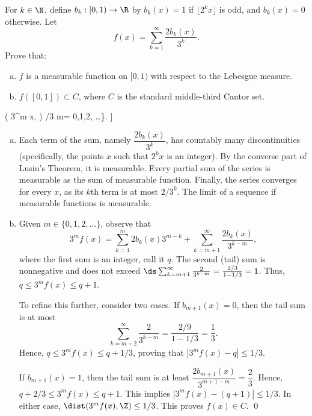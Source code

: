 \begin{hwsol}
For $k \in \N$, define $b_k: [0, 1) \to \R$ by $b_k(x)= 1$ if $\lfloor 2^k x\rfloor$ is odd, and $b_k (x)= 0$ otherwise. Let 
        \[
        f(x)= \sum_{k=1}^\infty \frac{2 b_k(x)}{3^k}.
        \]
Prove that: \hfill
        \begin{enumerate}[(a)]
        \item $f$ is a measurable function on $[0,1)$ with respect to the Lebesgue measure. 
        \item $f([0, 1]) \subset C$, where $C$ is the standard middle-third Cantor set. 
        \end{enumerate}
\noindent [Hint: You can use the following characterization of $C$, 
	\[
	C= \{ x \in [0, 1] \colon \dist( 3^m x, \Z) /3  m= 0,1,2,  \ldots \}. ]
	\]

\pf \hfill
\begin{enumerate}[(a)]
\item Each term of the sum, namely $\dfrac{2 b_k(x)}{3^k}$, has countably many discontinuities (specifically, the points $x$ such that $2^k x$ is an integer). By the converse part of Lusin's Theorem, it is measurable. Every partial sum of the series is measurable as  the sum of measurable function. Finally, the series converges for every $x$, as its $k$th term is at most $2/3^k$. The limit of a sequence if measurable functions is measurable.  

\item Given $m \in \{0,1,2, \ldots\}$, observe that 
        \[
        3^m f(x)= \sum_{k=1}^m 2 b_k(x)  3^{m-k} + \sum_{k=m+1}^\infty \frac{2 b_k(x)}{3^{k-m}},
        \]
where the first sum is an integer, call it $q$. The second (tail) sum is nonnegative and does not exceed $\ds\sum_{k=m+1}^\infty \frac{2  }{3^{k-m}}= \frac{2/3}{1-1/3}= 1$. Thus, $q \leq 3^{m}f(x) \leq q+1$. 

To refine this further, consider two cases. If $b_{m+1}(x)=0$, then the tail sum is at most 
        \[
        \sum_{k=m+2}^\infty \frac{2 }{3^{k-m}}= \frac{2/9}{1-1/3} = \frac{1}{3}.
        \]
Hence, $q \leq 3^{m}f(x) \leq q+1/3$, proving that $|3^m f(x) - q| \leq 1/3$.  

If $b_{m+1}(x)= 1$, then the tail sum is at least $\dfrac{2 b_{m+1}(x)}{3^{m+1-m}}= \dfrac{2}{3}$. Hence, $q + 2/3 \leq 3^{m}f(x) \leq q +  1$. This implies $|3^m f(x) - (q+1)|  \leq 1/3$. In either case, $\dist(3^mf(x), \Z) \leq 1/3$. This proves $f(x) \in C$. \qed \\
\end{enumerate}
 \end{hwsol}
 

